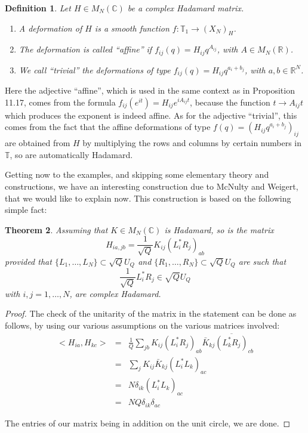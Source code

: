 \documentclass[12pt]{amsbook}
\newtheorem{theorem}{Theorem}[chapter]
\newtheorem{definition}[theorem]{Definition}
\begin{document}

\begin{definition}
Let $H\in M_N(\mathbb C)$ be a complex Hadamard matrix.
\begin{enumerate}
\item A deformation of $H$ is a smooth function $f:\mathbb T_1\to (X_N)_H$.

\item The deformation is called ``affine'' if $f_{ij}(q)=H_{ij}q^{A_{ij}}$, with $A\in M_N(\mathbb R)$.

\item We call ``trivial'' the deformations of type $f_{ij}(q)=H_{ij}q^{a_i+b_j}$, with $a,b\in\mathbb R^N$.
\end{enumerate}
\end{definition}

Here the adjective ``affine'', which is used in the same context as in Proposition 11.17, comes from the formula $f_{ij}(e^{it})=H_{ij}e^{iA_{ij}t}$, because the function $t\to A_{ij}t$ which produces the exponent is indeed affine. As for the adjective ``trivial'', this comes from the fact that the affine deformations of type $f(q)=(H_{ij}q^{a_i+b_j})_{ij}$ are obtained from $H$ by multiplying the rows and columns by certain numbers in $\mathbb T$, so are automatically Hadamard.

\bigskip

Getting now to the examples, and skipping some elementary theory and constructions, we have an interesting construction due to McNulty and Weigert, that we would like to explain now. This construction is based on the following simple fact:

\begin{theorem}
Assuming that $K\in M_N(\mathbb C)$ is Hadamard, so is the matrix
$$H_{ia,jb}=\frac{1}{\sqrt{Q}}K_{ij}(L_i^*R_j)_{ab}$$
provided that $\{L_1,\ldots,L_N\}\subset\sqrt{Q}U_Q$ and $\{R_1,\ldots,R_N\}\subset\sqrt{Q}U_Q$ are such that
$$\frac{1}{\sqrt{Q}}L_i^*R_j\in\sqrt{Q}U_Q$$
with $i,j=1,\ldots,N$, are complex Hadamard.
\end{theorem}

\begin{proof}
The check of the unitarity of the matrix in the statement can be done as follows, by using our various assumptions on the various matrices involved:
\begin{eqnarray*}
<H_{ia},H_{kc}>
&=&\frac{1}{Q}\sum_{jb}K_{ij}(L_i^*R_j)_{ab}\bar{K}_{kj}\overline{(L_k^*R_j)}_{cb}\\
&=&\sum_jK_{ij}\bar{K}_{kj}(L_i^*L_k)_{ac}\\
&=&N\delta_{ik}(L_i^*L_k)_{ac}\\
&=&NQ\delta_{ik}\delta_{ac}
\end{eqnarray*}

The entries of our matrix being in addition on the unit circle, we are done.
\end{proof}
\end{document}
